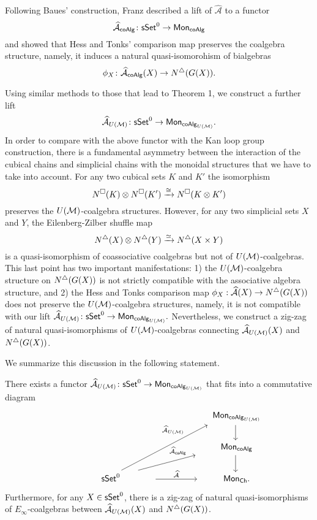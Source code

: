 Following Baues’ construction, Franz described a lift of $\widehat{\mathcal{A}}$ to a functor
$$\widehat{\mathcal{A}}_{\mathsf{coAlg}} \colon \mathsf{sSet}^0 \to \mathsf{Mon}_{\mathsf{coAlg}}$$ and showed that Hess and Tonks' comparison map preserves the coalgebra structure, namely, it induces a natural quasi-isomorohism of bialgebras
$$\phi_X \colon \widehat{\mathcal{A}}_{\mathsf{coAlg}}(X) \to N^{\triangle} (G(X)).$$

Using similar methods to those that lead to Theorem 1, we construct a further lift
$$\widehat{\mathcal{A}}_{U(\mathcal{M})} \colon \mathsf{sSet}^0 \to \mathsf{Mon}_{\mathsf{coAlg}_{U(\mathcal{M})}}.$$
In order to compare with the above functor with the Kan loop group construction, there is a fundamental asymmetry between the interaction of the cubical chains and simplicial chains with the monoidal structures that we have to take into account. For any two cubical sets $K$ and $K'$ the isomorphism $$N^{\square}(K) \otimes N^{\square}(K') \xrightarrow{\cong} N^{\square}(K \otimes K')$$ preserves the $U(\mathcal{M})$-coalgebra structures. However, for any two simplicial sets $X$ and $Y$, the Eilenberg-Zilber shuffle map $$N^{\triangle}(X) \otimes N^{\triangle}(Y) \xrightarrow{\simeq} N^{\triangle}(X \times Y)$$ is a quasi-isomorphism of coassociative coalgebras but not of $U(\mathcal{M})$-coalgebras. This last point has two important manifestations: 1) the $U(\mathcal{M})$-coalgebra structure on $N^{\triangle}(G(X))$ is not strictly compatible with the associative algebra structure, and 2) the Hess and Tonks comparison map $\phi_X: \widehat{\mathcal{A}}(X) \to N^{\triangle}(G(X))$ does not preserve the $U(\mathcal{M})$-coalgebra structures, namely, it is not compatible with our lift $\widehat{\mathcal{A}}_{U(\mathcal{M})} \colon \mathsf{sSet}^0 \to \mathsf{Mon}_{\mathsf{coAlg}_{U(\mathcal{M})}}.$ Nevertheless, we construct a zig-zag of natural quasi-isomorphisms of $U(\mathcal{M})$-coalgebras connecting $\widehat{\mathcal{A}}_{U(\mathcal{M})} (X)$ and $N^{\triangle}(G(X))$. 

We summarize this discussion in the following statement.

\begin{theorem} There exists a functor $\widehat{\mathcal{A}}_{U(\mathcal{M})} \colon \mathsf{sSet}^0 \to \mathsf{Mon}_{\mathsf{coAlg}_{U(\mathcal{M})}}$ that fits into a commutative diagram
\begin{equation*}
\begin{tikzcd}[column sep=large]
& \phantom{aaaaa}\Mon_{\coAlg_{U(\M)}} \arrow[d, shift left=5, ""]\\
& \phantom{aaaaa}\Mon_{\coAlg} \ar[d, shift left=5, ""]\\
\phantom{sssssssssss}\sSet^0 \phantom{aaaaaaa} \ar[r, "\widehat{\mathcal{A}}", ]\ar[ru, "\widehat{\mathcal{A}}_{\coAlg}", very near end]\arrow[ruu,  "\widehat{\mathcal{A}}_{U(\M)}", near end] & \phantom{aaaaa} \Mon_{\Ch}.
\end{tikzcd}
\end{equation*}
Furthermore, for any $X \in \mathsf{sSet}^0$, there is a zig-zag of natural quasi-isomorphisms of $E_{\infty}$-coalgebras between $\widehat{\mathcal{A}}_{U(\mathcal{M})}(X)$ and $N^{\triangle}(G(X))$.
\end{theorem}



